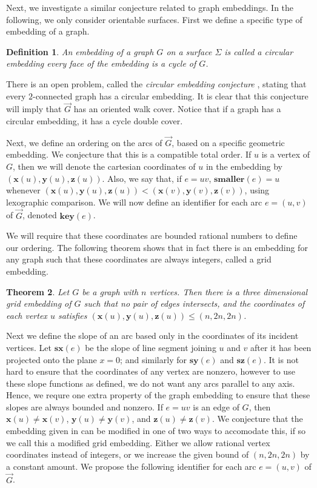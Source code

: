 \documentclass[12pt,letterpaper,oneside]{book}
\newcommand{\key}{\textbf{key}}
\newcommand{\closer}{\textbf{smaller}}
\newcommand{\xcor}{\textbf{x}}
\newcommand{\ycor}{\textbf{y}}
\newcommand{\zcor}{\textbf{z}}
\newcommand{\sx}{\textbf{sx}}
\newcommand{\sy}{\textbf{sy}}
\newcommand{\sz}{\textbf{sz}}
\newtheorem{theorem}{Theorem}[section]
\newtheorem{definition}[theorem]{Definition}
\begin{document}
Next, we investigate a similar conjecture related to graph embeddings.  
In the following, we only consider orientable surfaces.  First we define a specific type of embedding of a graph.  

\begin{definition}
An embedding of a graph $G$ on a surface $\Sigma$ is called a circular embedding every face of the embedding is 
a cycle of $G$.
\end{definition}


There is an open problem, called the \emph{circular embedding conjecture} \cite{J}, 
stating that every $2$-connected graph has a circular embedding.   
It is clear that this conjecture will imply that $\vec{G}$ has an oriented walk cover.  Notice that if a graph has a circular embedding, 
it has a cycle double cover.  


 
Next, we define an ordering on the arcs of $\vec{G}$, based on a specific geometric embedding.  We conjecture that this is a compatible 
total order.  
If $u$ is a vertex of $G$, then we will 
denote the cartesian coordinates of 
$u$ in the embedding by $( \xcor(u), \ycor(u), \zcor(u) )$.  Also, we say that, if $e=uv$, $\closer(e)=u$ whenever 
$(\xcor(u),\ycor(u),\zcor(u)) < (\xcor(v),\ycor(v),\zcor(v))$, using lexographic comparison.  We will now define 
an identifier for each arc $e=(u,v)$ of $\vec{G}$, denoted $\key(e)$.  

We will require that these coordinates are bounded rational numbers to define our ordering.  The following 
theorem shows that in fact there is an embedding for any graph such that these coordinates are always integers, called a grid embedding.  

\begin{theorem}
\emph{\cite{CETR}} Let $G$ be a graph with $n$ vertices.  Then there is a three dimensional grid embedding 
of $G$ such that no pair of edges intersects, and the coordinates of
each vertex $u$ satisfies $( \xcor(u), \ycor(u), \zcor(u) ) \le (n,2n,2n)$.
\end{theorem}

Next we define the slope of an arc based only in the coordinates of its incident vertices.  
Let $\sx(e)$ 
be the slope of line segment joining $u$ and $v$ after it has been projected onto the plane $x=0$; and similarly 
for $\sy(e)$ and $\sz(e)$.  It is not hard to ensure that the coordinates of any vertex are nonzero, however 
to use these slope functions as defined, we do not want any arcs parallel to any axis.  
Hence, we requre one extra property of the graph embedding to ensure that these slopes are always 
bounded and nonzero.  If $e=uv$ is an edge of $G$, then $\xcor(u)\ne \xcor(v)$, $\ycor(u)\ne \ycor(v)$, and $\zcor(u)\ne \zcor(v)$.  
We conjecture that 
the embedding given in \cite{CETR} can be modified in one of two ways to accomodate this, if so we call this a modified 
grid embedding.  Either we allow rational vertex coordinates 
instead of integers, or we increase the given bound of $(n,2n,2n)$ by a constant amount.  We propose the following 
identifier for each arc $e=(u,v)$ of $\vec{G}$.  
\end{document}
